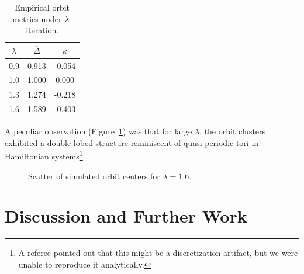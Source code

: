 \documentclass{amsart}
\begin{document}
\begin{table}[htbp]
\centering
\begin{tabular}{|c|c|c|}
\hline
$\lambda$ & $\overline{\Delta}$ & $\kappa$ \\
\hline
0.9 & 0.913 & -0.054 \\
1.0 & 1.000 &  0.000 \\
1.3 & 1.274 & -0.218 \\
1.6 & 1.589 & -0.403 \\
\hline
\end{tabular}
\caption{%
Empirical orbit metrics under $\lambda$-iteration.%
}
\label{tab:data}
\end{table}

A peculiar %
observation (Figure~\ref{fig:scatter}) was %
that for large $\lambda$, the orbit clusters exhibited %
a double-lobed structure reminiscent of quasi-periodic tori in Hamiltonian systems\footnote{A referee pointed out that this might be a discretization artifact, but we were unable to reproduce it analytically.}. 

\begin{figure}[htbp]
\centering
{}
\caption{Scatter of simulated orbit centers for $\lambda=1.6$.}
\label{fig:scatter}
\end{figure}

\section{Discussion and Further Work}
\end{document}
